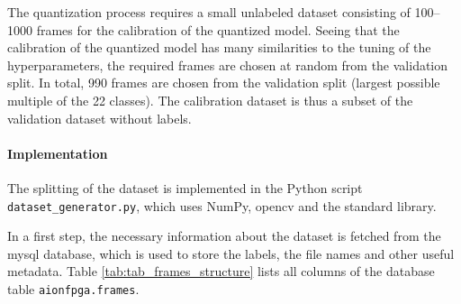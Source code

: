 The quantization process requires a small unlabeled dataset consisting of \numrange{100}{1000} frames for the calibration of the quantized model.
Seeing that the calibration of the quantized model has many similarities to the tuning of the hyperparameters, the required frames are chosen at random from the validation split.
In total, \num{990} frames are chosen from the validation split (largest possible multiple of the \num{22} classes).
The calibration dataset is thus a subset of the validation dataset without labels.

\paragraph{Implementation}
The splitting of the dataset is implemented in the Python script \texttt{dataset\_generator.py}, which uses NumPy, \acrshort{opencv} and the standard library.

In a first step, the necessary information about the dataset is fetched from the \acrshort{mysql} database, which is used to store the labels, the file names and other useful metadata.
Table \ref{tab:tab_frames_structure} lists all columns of the database table \texttt{aionfpga.frames}.

